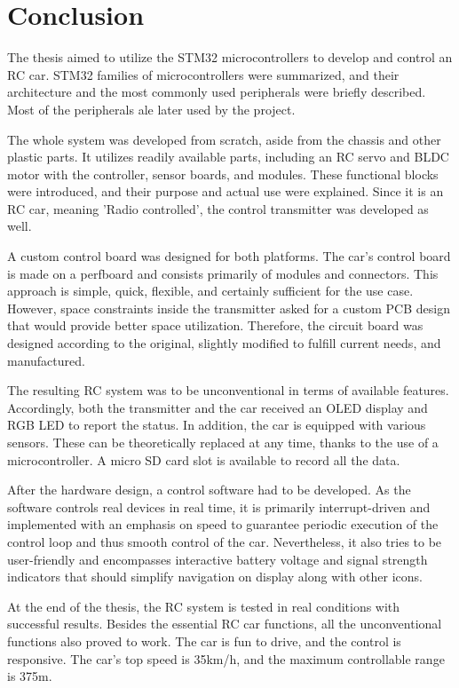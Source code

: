 


\part{Conclusion}
\label{chap:conclusion}
The thesis aimed to utilize the STM32 microcontrollers to develop and control an RC car. STM32 families of microcontrollers were summarized, and their architecture and the most commonly used peripherals were briefly described. Most of the peripherals ale later used by the project.

The whole system was developed from scratch, aside from the chassis and other plastic parts. It utilizes readily available parts, including an RC servo and BLDC motor with the controller, sensor boards, and modules. These functional blocks were introduced, and their purpose and actual use were explained. Since it is an RC car, meaning 'Radio controlled', the control transmitter was developed as well.

A custom control board was designed for both platforms. The car's control board is made on a perfboard and consists primarily of modules and connectors. This approach is simple, quick, flexible, and certainly sufficient for the use case. However, space constraints inside the transmitter asked for a custom PCB design that would provide better space utilization. Therefore, the circuit board was designed according to the original, slightly modified to fulfill current needs, and manufactured.

The resulting RC system was to be unconventional in terms of available features. Accordingly, both the transmitter and the car received an OLED display and RGB LED to report the status. In addition, the car is equipped with various sensors. These can be theoretically replaced at any time, thanks to the use of a microcontroller. A micro SD card slot is available to record all the data.

After the hardware design, a control software had to be developed. As the software controls real devices in real time, it is primarily interrupt-driven and implemented with an emphasis on speed to guarantee periodic execution of the control loop and thus smooth control of the car. Nevertheless, it also tries to be user-friendly and encompasses interactive battery voltage and signal strength indicators that should simplify navigation on display along with other icons.

At the end of the thesis, the RC system is tested in real conditions with successful results. Besides the essential RC car functions, all the unconventional functions also proved to work. The car is fun to drive, and the control is responsive. The car's top speed is 35km/h, and the maximum controllable range is 375m.

